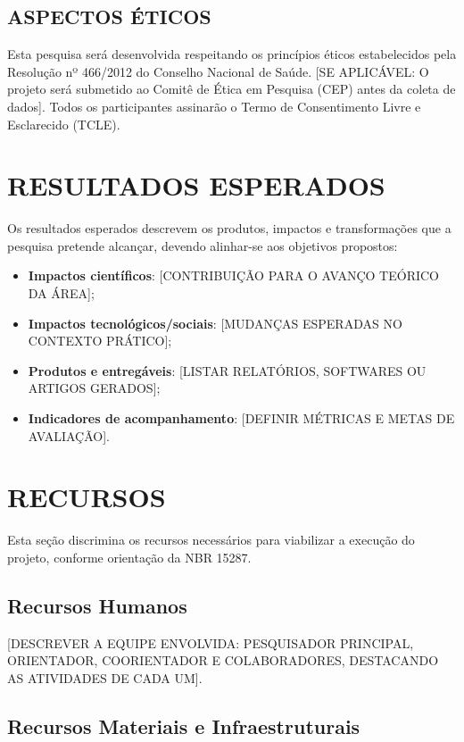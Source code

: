 \section{ASPECTOS ÉTICOS}
\label{sec:aspectos-eticos}

Esta pesquisa será desenvolvida respeitando os princípios éticos estabelecidos pela Resolução nº 466/2012 do Conselho Nacional de Saúde. [SE APLICÁVEL: O projeto será submetido ao Comitê de Ética em Pesquisa (CEP) antes da coleta de dados]. Todos os participantes assinarão o Termo de Consentimento Livre e Esclarecido (TCLE).


\chapter{RESULTADOS ESPERADOS}
\label{chap:resultados-esperados}

Os resultados esperados descrevem os produtos, impactos e transformações que a pesquisa pretende alcançar, devendo alinhar-se aos objetivos propostos:

\begin{itemize}
    \item \textbf{Impactos científicos}: [CONTRIBUIÇÃO PARA O AVANÇO TEÓRICO DA ÁREA];
    \item \textbf{Impactos tecnológicos/sociais}: [MUDANÇAS ESPERADAS NO CONTEXTO PRÁTICO];
    \item \textbf{Produtos e entregáveis}: [LISTAR RELATÓRIOS, SOFTWARES OU ARTIGOS GERADOS];
    \item \textbf{Indicadores de acompanhamento}: [DEFINIR MÉTRICAS E METAS DE AVALIAÇÃO].
\end{itemize}


\chapter{RECURSOS}
\label{chap:recursos}

Esta seção discrimina os recursos necessários para viabilizar a execução do projeto, conforme orientação da NBR 15287.

\section{Recursos Humanos}
\label{sec:recursos-humanos}

[DESCREVER A EQUIPE ENVOLVIDA: PESQUISADOR PRINCIPAL, ORIENTADOR, COORIENTADOR E COLABORADORES, DESTACANDO AS ATIVIDADES DE CADA UM].

\section{Recursos Materiais e Infraestruturais}
\label{sec:recursos-materiais}

